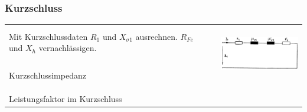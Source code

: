 		\subsubsection{Kurzschluss}
			\begin{tabular}{p{6cm}p{6cm}p{6.5cm}}
            		\begin{minipage}{12cm}
                    	Mit Kurzschlussdaten $R_1$ und $X_{\sigma1}$ ausrechnen. $R_{Fe}$ und $X_h$ vernachlässigen.
                    \end{minipage} 
					& &	
					\multirow{3}{6.5cm}{
	            		\includegraphics[height=2.5cm]{bilder/KurzschlussErsatzschaltbild.png} } \\
	            \\
				Kurzschlussimpedanz&
					\fbox{$\underline{Z}_k = R_k + jX_k$} \fbox{$Z_k = \frac{U_k}{I_k}$} \\
					& \fbox{$R_k = R_1 + R_2' = \cos{\varphi_k} \cdot Z_k  = \frac{P_k}{I_k^2}$}  \\
					& \fbox{$X_k = X_{\sigma1} + X_{\sigma2}' = \sin{\varphi_k} \cdot Z_k = \frac{Q_k}{I_k^2}$} \\
				Leistungsfaktor im Kurzschluss&
					\fbox{$\cos(\varphi_k) = \frac{P_k}{U_1 \cdot I_k} = \frac{P_k}{S_k}$} \\
             \end{tabular}

